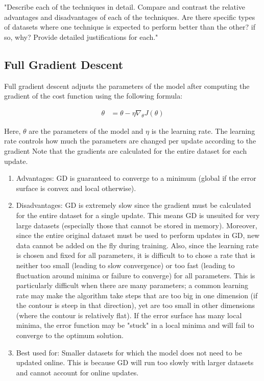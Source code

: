 \documentclass[twoside,11pt]{homework}
\begin{document}
"Describe each of the techniques in detail. Compare and contrast the relative advantages and
disadvantages of each of the techniques. Are there specific types of datasets where one technique is expected to perform better than the other? if so, why? Provide detailed justifications
for each."
\subsection*{Full Gradient Descent}
Full gradient descent adjusts the parameters of the model after computing the gradient of the cost function using the following formula:

\begin{align*}
	\theta &= \theta - \eta \nabla_\theta J(\theta)
\end{align*}

Here, $\theta$ are the parameters of the model and $\eta$ is the learning rate. The learning rate controls how much the parameters are changed per update according to the gradient Note that the gradients are calculated for the entire dataset for each update.

\begin{enumerate}
	\item Advantages: GD is guaranteed to converge to a minimum (global if the error surface is convex and local otherwise).
	\item Disadvantages: GD is extremely slow since the gradient must be calculated for the entire dataset for a single update. This means GD is unsuited for very large datasets (especially those that cannot be stored in memory). Moreover, since the entire original dataset must be used to perform updates in GD, new data cannot be added on the fly during training. Also, since the learning rate is chosen and fixed for all parameters, it is difficult to to chose a rate that is neither too small (leading to slow convergence) or too fast (leading to fluctuation around minima or failure to converge) for all parameters. This is particularly difficult when there are many parameters; a common learning rate may make the algorithm take steps that are too big in one dimension (if the contour is steep in that direction), yet are too small in other dimensions (where the contour is relatively flat). If the error surface has many local minima, the error function may be "stuck" in a local minima and will fail to converge to the optimum solution. 
	\item Best used for: Smaller datasets for which the model does not need to be updated online. This is because GD will run too slowly with larger datasets and cannot account for online updates. 
\end{enumerate}
\end{document}
